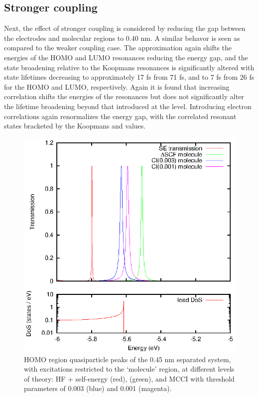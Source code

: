 \subsection{Stronger coupling}
Next, the effect of stronger coupling is considered by reducing the gap
between the electrodes and molecular regions to 0.40 nm.
A similar behavor is seen as compared to the weaker coupling case. The
\dscf approximation again shifts the energies of the HOMO and LUMO
resonances reducing the energy gap, and the state broadening relative to
the Koopmans resonances is significantly altered with state lifetimes
decreasing to approximately 17 fs from 71 fs, and to 7 fs from 26 fs for
the HOMO and LUMO, respectively.
Again it is found that increasing correlation shifts the energies of the
resonances but does not significantly alter the lifetime broadening beyond
that introduced at the \dscf level. Introducing electron correlations
again renormalizes the energy gap, with the correlated resonant states
bracketed by the Koopmans and \dscf values.

\begin{figure}
	\begin{center}
		\includegraphics[width=0.9\linewidth]{figures/figure4a_4b}
	\end{center}
	\caption{HOMO region quasiparticle peaks of the 0.45 nm separated
	         system, with excitations restricted to the `molecule' region,
		 at different levels of theory: HF + self-energy (red),
		 \dscf (green), and MCCI with threshold parameters of
		 0.003 (blue) and 0.001 (magenta).}
	\label{fig:all45Ahomo}
\end{figure}

